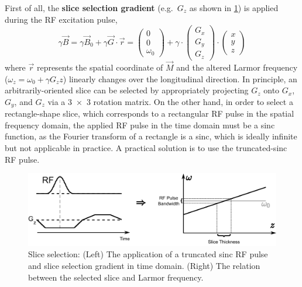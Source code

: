 First of all, the \textbf{slice selection gradient} (e.g.~$G_z$ as shown in \cref{Fig:mri-slice-sel}) is applied during the RF excitation pulse,
\begin{equation} \label{Equ:mri_slice}
  \gamma \vec{B} = \gamma \vec{B}_0 + \gamma \vec{G} \cdot \vec{r} = \left( \begin{array}{c} 
      0 \\
      0 \\
      \omega_0
    \end{array} \right) + \gamma \cdot \left( \begin{array}{c}
      G_x \\
      G_y \\
      G_z
    \end{array} \right) \cdot \left( \begin{array}{c}
     x \\
     y \\
     z
    \end{array} \right)
\end{equation}
where $\vec{r}$ represents the spatial coordinate of $\vec{M}$ and the altered Larmor frequency ($\omega_z = \omega_0 + \gamma G_{z} z$) linearly changes over the longitudinal direction. In principle, an arbitrarily-oriented slice can be selected by appropriately projecting $G_z$ onto $G_x$, $G_y$, and $G_z$ via a \num{3x3} rotation matrix. On the other hand, in order to select a rectangle-shape slice, which corresponds to a rectangular RF pulse in the spatial frequency domain, the applied RF pulse in the time domain must be a sinc function, as the Fourier transform of a rectangle is a sinc, which is ideally infinite but not applicable in practice. A practical solution is to use the truncated-sinc RF pulse.
\begin{figure}[tb]
  \centering
  \includegraphics[width=1.0\textwidth]{fig/mri-slice-sel.png}
  \caption{Slice selection: (Left) The application of a truncated sinc RF pulse and slice selection gradient in time domain. (Right) The relation between the selected slice and Larmor frequency.} \label{Fig:mri-slice-sel}
\end{figure}

